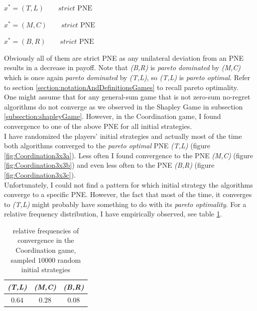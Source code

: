 \begin{description}\centering
    \item $x^{*} = (T,L) \qquad \textit{strict }\text{PNE}$
    \item $x^{*} = (M,C) \qquad \textit{strict }\text{PNE}$
    \item $x^{*} = (B,R) \qquad \textit{strict }\text{PNE}$
\end{description}

Obviously all of them are strict PNE as any unilateral deviation from an PNE results in a decrease in payoff. Note that \textit{(B,R)} is \textit{pareto dominated} by \textit{(M,C)} which is once again \textit{pareto dominated} by \textit{(T,L)}, so \textit{(T,L)} is \textit{pareto optimal}. Refer to section \ref{section:notationAndDefinitionsGames} to recall pareto optimality. \\

One might assume that for any general-sum game that is not zero-sum no-regret algorithms do not converge as we observed in the Shapley Game in subsection \ref{subsection:shapleyGame}. However, in the Coordination game, I found convergence to one of the above PNE for all initial strategies. \\ 

I have randomized the players' initial strategies and actually most of the time both algorithms converged to the \textit{pareto optimal} PNE \textit{(T,L)} (figure \ref{fig:Coordination3x3a}). Less often I found convergence to the PNE \textit{(M,C)} (figure \ref{fig:Coordination3x3b}) and even less often to the PNE \textit{(B,R)} (figure \ref{fig:Coordination3x3c}). \\ 

Unfortunately, I could not find a pattern for which initial strategy the algorithms converge to a specific PNE. However, the fact that most of the time, it converges to \textit{(T,L)} might probably have something to do with its \textit{pareto optimality}. For a relative frequency distribution, I have empirically observed, see table \ref{tab:frequencies}. \\

\begin{table}[H]
\centering
\captionsetup{justification=centering}
 \begin{tabular}{||c c c||} 
 \hline
 \textit{(T,L)} & \textit{(M,C)} & \textit{(B,R)} \\ [0.5ex] 
 \hline\hline
 $0.64$ & $0.28$ & $0.08$ \\ [1ex] 
 \hline
 \end{tabular}\caption{\label{tab:frequencies}relative frequencies of convergence in the Coordination game, \\
 sampled $10000$ random initial strategies}
\end{table}

